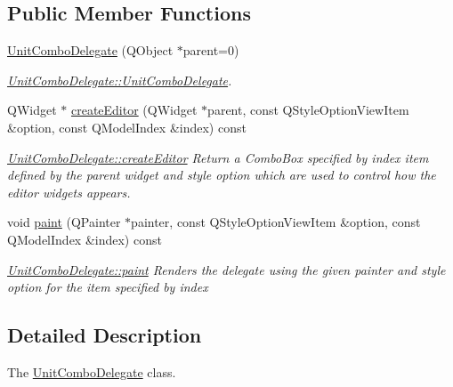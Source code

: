 \subsection*{Public Member Functions}
\begin{DoxyCompactItemize}
\item 
\hyperlink{classGui_1_1Widgets_1_1Delegates_1_1UnitComboDelegate_afd1dc5362c4ed8263354e80337d9958a}{Unit\+Combo\+Delegate} (Q\+Object $\ast$parent=0)
\begin{DoxyCompactList}\small\item\em \hyperlink{classGui_1_1Widgets_1_1Delegates_1_1UnitComboDelegate_afd1dc5362c4ed8263354e80337d9958a}{Unit\+Combo\+Delegate\+::\+Unit\+Combo\+Delegate}. \end{DoxyCompactList}\item 
Q\+Widget $\ast$ \hyperlink{classGui_1_1Widgets_1_1Delegates_1_1UnitComboDelegate_a246f92146bdf89200867629b68e3a86a}{create\+Editor} (Q\+Widget $\ast$parent, const Q\+Style\+Option\+View\+Item \&option, const Q\+Model\+Index \&index) const 
\begin{DoxyCompactList}\small\item\em \hyperlink{classGui_1_1Widgets_1_1Delegates_1_1UnitComboDelegate_a246f92146bdf89200867629b68e3a86a}{Unit\+Combo\+Delegate\+::create\+Editor} Return a Combo\+Box specified by {\itshape index} item defined by the {\itshape parent} widget and style {\itshape option} which are used to control how the editor widgets appears. \end{DoxyCompactList}\item 
void \hyperlink{classGui_1_1Widgets_1_1Delegates_1_1UnitComboDelegate_a2efed5aa3b9bde3cd80e9518cde00e60}{paint} (Q\+Painter $\ast$painter, const Q\+Style\+Option\+View\+Item \&option, const Q\+Model\+Index \&index) const 
\begin{DoxyCompactList}\small\item\em \hyperlink{classGui_1_1Widgets_1_1Delegates_1_1UnitComboDelegate_a2efed5aa3b9bde3cd80e9518cde00e60}{Unit\+Combo\+Delegate\+::paint} Renders the delegate using the given {\itshape painter} and style {\itshape option} for the item specified by {\itshape index} \end{DoxyCompactList}\end{DoxyCompactItemize}


\subsection{Detailed Description}
The \hyperlink{classGui_1_1Widgets_1_1Delegates_1_1UnitComboDelegate}{Unit\+Combo\+Delegate} class. 

